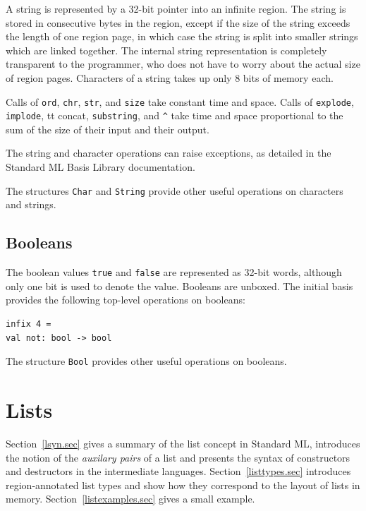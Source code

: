 \documentclass[12pt]{book}
\begin{document}
A string is represented by a 32-bit pointer into an infinite region.
The string is stored in consecutive bytes in the region, except if the
size of the string exceeds the length of one region page, in which
case the string is split into smaller strings which are linked
together. The internal string representation is completely transparent
to the programmer, who does not have to worry about the actual size of
region pages. Characters of a string takes up only 8 bits of
memory each.

Calls of {\tt ord}, {\tt chr}, {\tt str}, and {\tt size} take constant
time and space.  Calls of {\tt explode}, {\tt implode}, {tt concat},
{\tt substring}, and \verb+^+ take time and space proportional to the
sum of the size of their input and their output.

The string and character operations can raise exceptions, as detailed in the
Standard ML Basis Library documentation.

The structures {\tt Char} and {\tt String} provide other useful
operations on characters and strings.

\section{Booleans}
The boolean values {\tt true} and {\tt false} are represented as
32-bit words, although only one bit is used to denote the value.
Booleans are unboxed. The initial basis provides
the following top-level operations on booleans:\index{{\tt
    =}}
\begin{verbatim}
infix 4 =
val not: bool -> bool
\end{verbatim}
The structure {\tt Bool} provides other useful operations on booleans.

%
\chapter{Lists}
\label{lists.sec}
%
Section~\ref{lsyn.sec} gives
a summary of the list concept in Standard ML, introduces
the notion of the {\em auxilary pairs} of a list and presents the
syntax of constructors and destructors in the intermediate languages.
Section~\ref{listtypes.sec} introduces region-annotated list types and
show how they correspond to the layout of lists in memory. 
Section~\ref{listexamples.sec} gives a small example.
\end{document}
